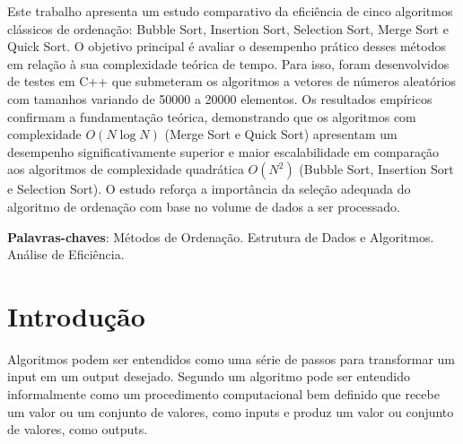 \documentclass[
	article,			%
	11pt,				%
	oneside,			%
	a4paper,			%
	english,			%
	brazil,				%
	sumario=tradicional
	]{abntex2}
\begin{document}
\frenchspacing 



%
\maketitle

\begin{resumoumacoluna}
Este trabalho apresenta um estudo comparativo da eficiência de cinco algoritmos clássicos
de ordenação: Bubble Sort, Insertion Sort, Selection Sort, Merge Sort e Quick Sort. O
objetivo principal é avaliar o desempenho prático desses métodos em relação à sua
complexidade teórica de tempo. Para isso, foram desenvolvidos de testes em C++ que
submeteram os algoritmos a vetores de números aleatórios com tamanhos variando de 50000
a 20000 elementos. Os resultados empíricos confirmam a fundamentação teórica,
demonstrando que os algoritmos com complexidade $O(N \log N)$ (Merge Sort e Quick
Sort) apresentam um desempenho significativamente superior e maior escalabilidade em
comparação aos algoritmos de complexidade quadrática $O(N^2)$ (Bubble Sort, Insertion
Sort e Selection Sort). O estudo reforça a importância da seleção adequada do algoritmo
de ordenação com base no volume de dados a ser processado.
 \vspace{\onelineskip}
 
 \noindent
 \textbf{Palavras-chaves}: Métodos de Ordenação. Estrutura de Dados e Algoritmos. Análise de Eficiência.
\end{resumoumacoluna}



\textual

\section*{Introdução}
Algoritmos podem ser entendidos como uma série de passos para transformar um input em um output desejado. Segundo  um algoritmo pode ser entendido informalmente como um procedimento computacional bem definido que recebe um valor ou um conjunto de valores, como inputs e produz um valor ou conjunto de valores, como outputs.
\end{document}
